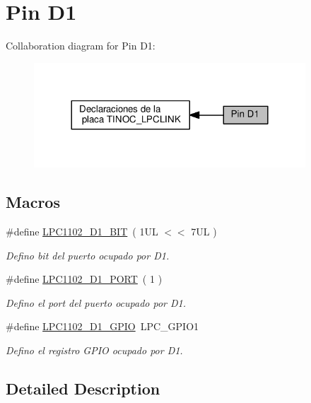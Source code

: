 \hypertarget{group___p_i_n_d1}{}\section{Pin D1}
\label{group___p_i_n_d1}
Collaboration diagram for Pin D1\+:\nopagebreak
\begin{figure}[H]
\begin{center}
\leavevmode
\includegraphics[width=288pt]{group___p_i_n_d1}
\end{center}
\end{figure}
\subsection*{Macros}
\begin{DoxyCompactItemize}
\item 
\#define \hyperlink{group___p_i_n_d1_ga6ae9457c4b1f79250abe5f2960e3a8ee}{L\+P\+C1102\+\_\+\+D1\+\_\+\+B\+IT}~( 1\+U\+L $<$$<$ 7\+U\+L )
\begin{DoxyCompactList}\small\item\em Defino bit del puerto ocupado por D1. \end{DoxyCompactList}\item 
\#define \hyperlink{group___p_i_n_d1_gafc2bbd3830383d98ab56a04c3cd3df20}{L\+P\+C1102\+\_\+\+D1\+\_\+\+P\+O\+RT}~( 1 )
\begin{DoxyCompactList}\small\item\em Defino el port del puerto ocupado por D1. \end{DoxyCompactList}\item 
\#define \hyperlink{group___p_i_n_d1_ga74109f9dcb7ca9657b785faae9d1d142}{L\+P\+C1102\+\_\+\+D1\+\_\+\+G\+P\+IO}~L\+P\+C\+\_\+\+G\+P\+I\+O1
\begin{DoxyCompactList}\small\item\em Defino el registro G\+P\+IO ocupado por D1. \end{DoxyCompactList}\end{DoxyCompactItemize}


\subsection{Detailed Description}


